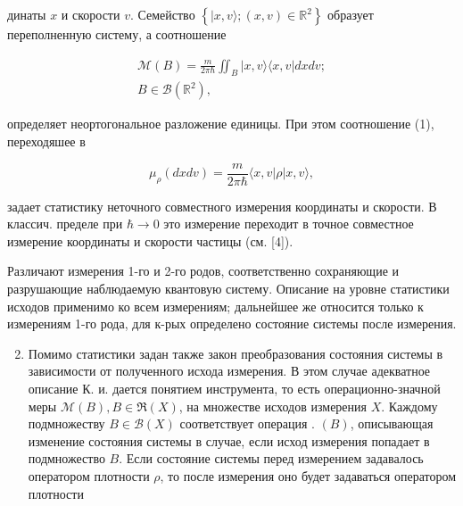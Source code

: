 \documentclass[10pt]{article}
\begin{document}
динаты $x$ и скорости $v$. Семейство $\left\{|x, v\rangle ;(x, v) \in \mathbb{R}^{2}\right\}$ образует переполненную систему, а соотношение



\[

\begin{gathered}

\mathscr{M}(B)=\frac{m}{2 \pi \hbar} \iint_{B}|x, v\rangle\langle x, v| d x d v ; \\

B \in \mathscr{B}\left(\mathbb{R}^{2}\right),

\end{gathered}

\]



определяет неортогональное разложение единицы. При этом соотношение (1), переходяшее в



\[

\mu_{\rho}(d x d v)=\frac{m}{2 \pi \hbar}\langle x, v|\rho| x, v\rangle,

\]



задает статистику неточного совместного измерения координаты и скорости. В классич. пределе при $\hbar \rightarrow 0$ это измерение переходит в точное совместное измерение координаты и скорости частицы (см. [4]).



Различают измерения 1-го и 2-го родов, соответственно сохраняющие и разрушающие наблюдаемую квантовую систему. Описание на уровне статистики исходов применимо ко всем измерениям; дальнейшее же относится только к измерениям 1-го рода, для к-рых определено состояние системы после измерения.



\begin{enumerate}

  \setcounter{enumi}{1}

  \item Помимо статистики задан также закон преобразования состояния системы в зависимости от полученного исхода измерения. В этом случае адекватное описание К. и. дается понятием инструмента, то есть операционно-значной меры $\mathscr{M}(B), B \in \Re(X)$, на множестве исходов измерения $X$. Каждому подмножеству $B \in \mathscr{B}(X)$ соответствует операция . $(B)$, описывающая изменение состояния системы в случае, если исход измерения попадает в подмножество $B$. Если состояние системы перед измерением задавалось оператором плотности $\rho$, то после измерения оно будет задаваться оператором плотности

\end{enumerate}
\end{document}
